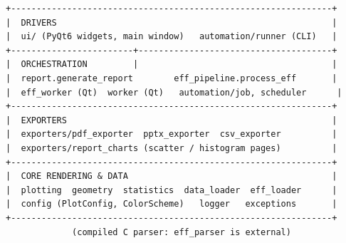 \documentclass[11pt,a4paper]{report}
\begin{document}
\begin{lstlisting}[style=plain]
+---------------------------------------------------------------+
|  DRIVERS                                                      |
|  ui/ (PyQt6 widgets, main window)   automation/runner (CLI)   |
+------------------------+--------------------------------------+
|  ORCHESTRATION         |                                      |
|  report.generate_report        eff_pipeline.process_eff       |
|  eff_worker (Qt)  worker (Qt)   automation/job, scheduler      |
+---------------------------------------------------------------+
|  EXPORTERS                                                    |
|  exporters/pdf_exporter  pptx_exporter  csv_exporter          |
|  exporters/report_charts (scatter / histogram pages)          |
+---------------------------------------------------------------+
|  CORE RENDERING & DATA                                        |
|  plotting  geometry  statistics  data_loader  eff_loader      |
|  config (PlotConfig, ColorScheme)   logger   exceptions       |
+---------------------------------------------------------------+
             (compiled C parser: eff_parser is external)
\end{lstlisting}
\end{document}
